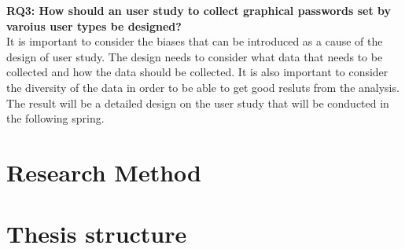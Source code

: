     {\bf RQ3: How should an user study to collect graphical passwords set by varoius user types be designed?} \\
    It is important to consider the biases that can be introduced as a cause of the design of user study. The design needs to consider what data that needs to be collected and how the data should be collected. It is also important to consider the diversity of the data in order to be able to get good resluts from the analysis. The result will be a detailed design on the user study that will be conducted in the following spring. 

  \section{Research Method}


  \section{Thesis structure}






